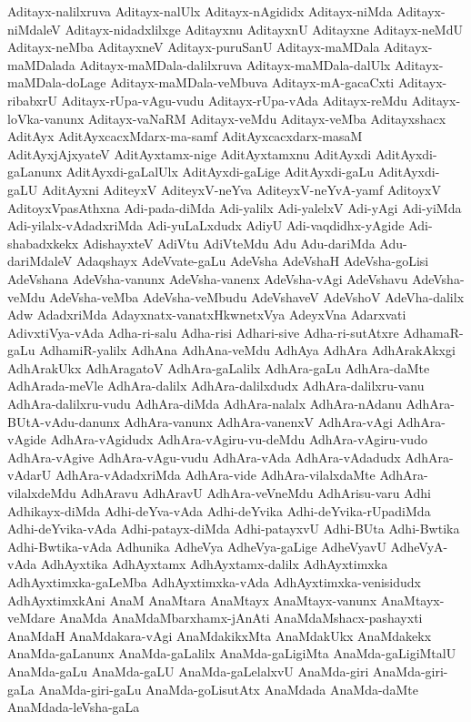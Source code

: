 {Aditayx-nalilxruva
Aditayx-nalUlx
Aditayx-nAgididx
Aditayx-niMda
Aditayx-niMdaleV
Aditayx-nidadxlilxge
Aditayxnu
AditayxnU
Aditayxne
Aditayx-neMdU
Aditayx-neMba
AditayxneV
Aditayx-puruSanU
Aditayx-maMDala
Aditayx-maMDalada
Aditayx-maMDala-dalilxruva
Aditayx-maMDala-dalUlx
Aditayx-maMDala-doLage
Aditayx-maMDala-veMbuva
Aditayx-mA-gacaCxti
Aditayx-ribabxrU
Aditayx-rUpa-vAgu-vudu
Aditayx-rUpa-vAda
Aditayx-reMdu
Aditayx-loVka-vanunx
Aditayx-vaNaRM
Aditayx-veMdu
Aditayx-veMba
Aditayxshacx
AditAyx
AditAyxcacxMdarx-ma-samf
AditAyxcacxdarx-masaM
AditAyxjAjxyateV
AditAyxtamx-nige
AditAyxtamxnu
AditAyxdi
AditAyxdi-gaLanunx
AditAyxdi-gaLalUlx
AditAyxdi-gaLige
AditAyxdi-gaLu
AditAyxdi-gaLU
AditAyxni
AditeyxV
AditeyxV-neYva
AditeyxV-neYvA-yamf
AditoyxV
AditoyxVpasAthxna
Adi-pada-diMda
Adi-yalilx
Adi-yalelxV
Adi-yAgi
Adi-yiMda
Adi-yilalx-vAdadxriMda
Adi-yuLaLxdudx
AdiyU
Adi-vaqdidhx-yAgide
Adi-shabadxkekx
AdishayxteV
AdiVtu
AdiVteMdu
Adu
Adu-dariMda
Adu-dariMdaleV
Adaqshayx
AdeVvate-gaLu
AdeVsha
AdeVshaH
AdeVsha-goLisi
AdeVshana
AdeVsha-vanunx
AdeVsha-vanenx
AdeVsha-vAgi
AdeVshavu
AdeVsha-veMdu
AdeVsha-veMba
AdeVsha-veMbudu
AdeVshaveV
AdeVshoV
AdeVha-dalilx
Adw
AdadxriMda
Adayxnatx-vanatxHkwnetxVya
AdeyxVna
Adarxvati
AdivxtiVya-vAda
Adha-ri-salu
Adha-risi
Adhari-sive
Adha-ri-sutAtxre
AdhamaR-gaLu
AdhamiR-yalilx
AdhAna
AdhAna-veMdu
AdhAya
AdhAra
AdhArakAkxgi
AdhArakUkx
AdhAragatoV
AdhAra-gaLalilx
AdhAra-gaLu
AdhAra-daMte
AdhArada-meVle
AdhAra-dalilx
AdhAra-dalilxdudx
AdhAra-dalilxru-vanu
AdhAra-dalilxru-vudu
AdhAra-diMda
AdhAra-nalalx
AdhAra-nAdanu
AdhAra-BUtA-vAdu-danunx
AdhAra-vanunx
AdhAra-vanenxV
AdhAra-vAgi
AdhAra-vAgide
AdhAra-vAgidudx
AdhAra-vAgiru-vu-deMdu
AdhAra-vAgiru-vudo
AdhAra-vAgive
AdhAra-vAgu-vudu
AdhAra-vAda
AdhAra-vAdadudx
AdhAra-vAdarU
AdhAra-vAdadxriMda
AdhAra-vide
AdhAra-vilalxdaMte
AdhAra-vilalxdeMdu
AdhAravu
AdhAravU
AdhAra-veVneMdu
AdhArisu-varu
Adhi
Adhikayx-diMda
Adhi-deYva-vAda
Adhi-deYvika
Adhi-deYvika-rUpadiMda
Adhi-deYvika-vAda
Adhi-patayx-diMda
Adhi-patayxvU
Adhi-BUta
Adhi-Bwtika
Adhi-Bwtika-vAda
Adhunika
AdheVya
AdheVya-gaLige
AdheVyavU
AdheVyA-vAda
AdhAyxtika
AdhAyxtamx
AdhAyxtamx-dalilx
AdhAyxtimxka
AdhAyxtimxka-gaLeMba
AdhAyxtimxka-vAda
AdhAyxtimxka-venisidudx
AdhAyxtimxkAni
AnaM
AnaMtara
AnaMtayx
AnaMtayx-vanunx
AnaMtayx-veMdare
AnaMda
AnaMdaMbarxhamx-jAnAti
AnaMdaMshacx-pashayxti
AnaMdaH
AnaMdakara-vAgi
AnaMdakikxMta
AnaMdakUkx
AnaMdakekx
AnaMda-gaLanunx
AnaMda-gaLalilx
AnaMda-gaLigiMta
AnaMda-gaLigiMtalU
AnaMda-gaLu
AnaMda-gaLU
AnaMda-gaLelalxvU
AnaMda-giri
AnaMda-giri-gaLa
AnaMda-giri-gaLu
AnaMda-goLisutAtx
AnaMdada
AnaMda-daMte
AnaMdada-leVsha-gaLa
}
